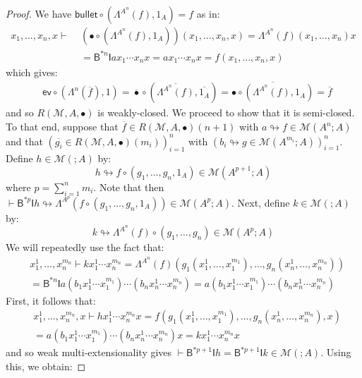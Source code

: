 \documentclass{llncs}
\begin{document}
\begin{proof}
  We have $\mathsf{bullet} \circ (\Lambda^{A^n}(f),1_A) = f$ as in:
  \begin{align*}
    x_1,\ldots,x_n,x \vdash\,\,& (\mathsf{\bullet} \circ (\Lambda^{A^n}(f),1_A))(x_1,\ldots,x_n,x)
    = \Lambda^{A^n}(f)(x_1,\ldots,x_n)x
    \\&= \mathsf{B}^{*n}\mathsf{I}ax_1 \cdots x_nx
    = ax_1\cdots x_nx
    = f(x_1,\ldots,x_n,x)
  \end{align*}
  which gives:
  \begin{align*}
    & \mathsf{ev} \circ (\Lambda^n(\overline{f}),1)
      = \overline{\bullet} \circ (\overline{\Lambda^{A^n}(f)},\overline{1_A})
      = \overline{\bullet \circ (\Lambda^{A^n}(f),1_A)}
      = \overline{f}
  \end{align*}
  and so $R(\mathcal{M},A,\bullet)$ is weakly-closed. We proceed to show that it is semi-closed. To that end, suppose that $\overline{f} \in R(\mathcal{M},A,\bullet)(n+1)$ with $a \looparrowright f \in \mathcal{M}(A^n;A)$ and that $\left(\overline{g_i} \in R(\mathcal{M},A,\bullet)(m_i) \right)_{i=1}^n$ with $\left(b_i \looparrowright g \in \mathcal{M}(A^{m_i};A)\right)_{i=1}^n$. Define $h \in \mathcal{M}(;A)$ by:
  \[
    h \looparrowright f \circ (g_1,\ldots,g_n,1_A) \in \mathcal{M}(A^{p+1};A)
  \]
  where $p = \sum_{i=1}^n m_i$. Note that then $\vdash \mathsf{B}^{*p}\mathsf{I}h \looparrowright \Lambda^{A^p}(f \circ (g_1,\ldots,g_n,1_A)) \in \mathcal{M}(A^p;A)$. Next, define $k \in \mathcal{M}(;A)$ by:
  \[
    k \looparrowright \Lambda^{A^n}(f) \circ (g_1,\ldots,g_n) \in \mathcal{M}(A^p;A)
  \]
  We will repeatedly use the fact that:
  \begin{align*}
    & x_1^1,\ldots,x_n^{m_n} \vdash
      k x_1^1 \cdots x_n^{m_n}
      = \Lambda^{A^n}(f)(g_1(x_1^1,\ldots,x_1^{m_1}),\ldots,g_n(x_n^1,\ldots,x_n^{m_n}))
      \\&= \mathsf{B}^{*n}\mathsf{I}a(b_1x_1^1 \cdots x_1^{m_1}) \cdots (b_nx_n^1 \cdots x_n^{m_n})
      = a(b_1x_1^1 \cdots x_1^{m_1}) \cdots (b_n x_n^1 \cdots x_n^{m_n})
  \end{align*}
  First, it follows that:
  \begin{align*}
    & x_1^1,\ldots,x_n^{m_n},x \vdash h x_1^1 \cdots x_n^{m_n} x 
      = f(g_1(x_1^1,\ldots,x_1^{m_1}),\ldots,g_n(x_n^1,\ldots,x_n^{m_n}),x)
    \\&= a(b_1x_1^1 \cdots x_1^{m_1}) \cdots (b_n x_n^1 \cdots x_n^{m_n})x
    = kx_1^1 \cdots x_n^{m_n} x
  \end{align*}
  and so weak multi-extensionality gives $\vdash \mathsf{B}^{*p+1}\mathsf{I}h = \mathsf{B}^{*p+1}\mathsf{I}k \in \mathcal{M}(;A)$. Using this, we obtain:

\end{proof}
\end{document}
